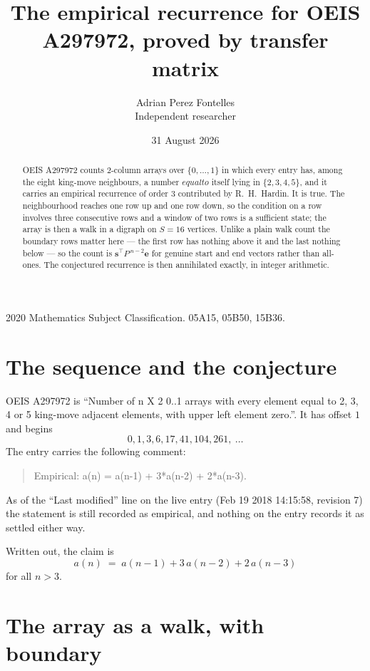 \documentclass[11pt,a4paper]{article}
\title{The empirical recurrence for OEIS A297972, proved by transfer matrix}
\author{Adrian Perez Fontelles\\ \small Independent researcher}
\date{31 August 2026}
\theoremstyle{plain}
\theoremstyle{definition}
\begin{document}
\maketitle

\begin{abstract}
OEIS A297972 counts $2$-column arrays over $\{0,\dots,1\}$ in which every entry has,
among the eight king-move neighbours, a number $equal to$ itself lying in $\{2,3,4,5\}$, and it carries an empirical
recurrence of order $3$ contributed by R.~H.~Hardin. It is true. The neighbourhood
reaches one row up and one row down, so the condition on a row involves three consecutive
rows and a window of two rows is a sufficient state; the array is then a walk in a digraph
on $S=16$ vertices. Unlike a plain walk count the boundary rows matter here --- the first
row has nothing above it and the last nothing below --- so the count is
$\mathbf{s}^{\!\top}P^{\,n-2}\mathbf{e}$ for genuine start and end vectors rather than
all-ones. The conjectured recurrence is then annihilated exactly, in integer arithmetic.
\end{abstract}

\noindent\small 2020 Mathematics Subject Classification. 05A15, 05B50, 15B36.\normalsize

\section{The sequence and the conjecture}

OEIS A297972 is ``Number of n X 2 0..1 arrays with every element equal to 2, 3, 4 or 5 king-move adjacent elements, with upper left element zero.''. It has offset
$1$ and begins
\[
0, 1, 3, 6, 17, 41, 104, 261,\ \dots
\]
The entry carries the following comment:
\begin{quote}\small
Empirical: a(n) = a(n-1) + 3*a(n-2) + 2*a(n-3).
\end{quote}
As of the ``Last modified'' line on the live entry (Feb 19 2018 14:15:58, revision
7) the statement is still recorded as empirical, and nothing on the entry
records it as settled either way.

Written out, the claim is
\begin{equation}\label{eq:conj}
a(n)\;=\;a(n-1) + 3\,a(n-2) + 2\,a(n-3)
\end{equation}
for all $n>3$.

\section{The array as a walk, with boundary}
\end{document}
